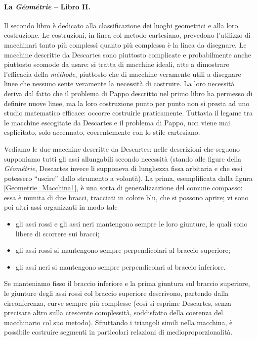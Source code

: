 \paragraph{La \textit{G\'eom\'etrie} -- Libro II.} Il secondo libro \`e dedicato alla classificazione dei luoghi geometrici e alla loro costruzione. Le costruzioni, in linea col metodo cartesiano, prevedono l'utilizzo di macchinari tanto pi\`u complessi quanto pi\`u complessa \`e la linea da disegnare. Le macchine descritte da Descartes sono piuttosto complicate e probabilmente anche piuttosto scomode da usare: si tratta di macchine ideali, atte a dimostrare l'efficacia della \textit{m\'ethode}, piuttosto che di macchine veramente utili a disegnare linee che nessuno sente veramente la necessit\`a di costruire. La loro necessit\`a deriva dal fatto che il problema di Pappo descritto nel primo libro ha permesso di definire nuove linee, ma la loro costruzione punto per punto non si presta ad uno studio matematico efficace: occorre costruirle praticamente. Tuttavia il legame tra le macchine escogitate da Descartes e il problema di Pappo, non viene mai esplicitato, solo accennato, coerentemente con lo stile cartesiano.
\par Vediamo le due macchine descritte da Descartes: nelle descrizioni che seguono supponiamo tutti gli assi allungabili secondo necessit\`a (stando alle figure della \textit{G\'eom\'etrie}, Descartes invece li supponeva di lunghezza fissa arbitaria e che essi potessero ``uscire'' dallo strumento a volont\`a). La prima, esemplificata dalla figura \ref{Geometrie_Macchina1}, \`e una sorta di generalizzazione del comune compasso: essa \`e munita di due bracci, tracciati in colore blu, che si possono aprire; vi sono poi altri assi organizzati in modo tale
\begin{itemize}
	\item gli assi rossi e gli assi neri mantengono sempre le loro giunture, le quali sono libere di scorrere sui bracci;
	\item gli assi rossi si mantengono sempre perpendicolari al braccio superiore;
	\item gli assi neri si mantengono sempre perpendicolari al braccio inferiore.
\end{itemize}
\par Se manteniamo fisso il braccio inferiore e la prima giuntura sul braccio superiore, le giunture degli assi rossi col braccio superiore descrivono, partendo dalla circonferenza, curve sempre pi\`u complesse (cos\`i si esprime Descartes, senza precisare altro sulla crescente complessit\`a, soddisfatto della coerenza del macchinario col suo metodo). Sfruttando i triangoli simili nella macchina, \`e possibile costruire segmenti in particolari relazioni di medioproporzionalit\`a.
